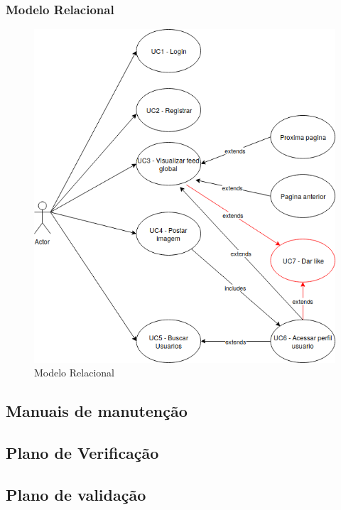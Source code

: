 \subsubsection{Modelo Relacional} 
\begin{figure}[ht]
	\centering
	\includegraphics[width=\textwidth]{./g/casodeuso.png}
	\caption{Modelo Relacional}
	\label{fig:modeloRelacional}
\end{figure}

\subsection{Manuais de manutenção}

\subsection{Plano de Verificação}

\subsection{Plano de validação}

